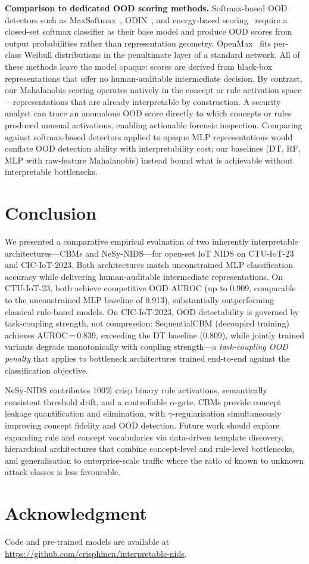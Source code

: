 \documentclass[conference]{IEEEtran}
\begin{document}
\textbf{Comparison to dedicated OOD scoring methods.}
Softmax-based OOD detectors such as
MaxSoftmax~\cite{hendrycks2017baseline}, ODIN~\cite{liang2018odin}, and
energy-based scoring~\cite{liu2020energy} require a closed-set softmax
classifier as their base model and produce OOD scores from output
probabilities rather than representation geometry. OpenMax~\cite{bendale2016openmax}
fits per-class Weibull distributions in the penultimate layer of a
standard network. All of these methods leave the model opaque: scores
are derived from black-box representations that offer no human-auditable
intermediate decision. By contrast, our Mahalanobis scoring operates
natively in the concept or rule activation space---representations that
are already interpretable by construction. A security analyst can trace
an anomalous OOD score directly to which concepts or rules produced
unusual activations, enabling actionable forensic inspection. Comparing
against softmax-based detectors applied to opaque MLP representations
would conflate OOD detection ability with interpretability cost; our
baselines (DT, RF, MLP with raw-feature Mahalanobis) instead bound
what is achievable without interpretable bottlenecks.

\section{Conclusion}

We presented a comparative empirical evaluation of two inherently
interpretable architectures---CBMs and NeSy-NIDS---for open-set IoT
NIDS on CTU-IoT-23 and CIC-IoT-2023. Both architectures match
unconstrained MLP classification accuracy while delivering
human-auditable intermediate representations. On CTU-IoT-23, both
achieve competitive OOD AUROC (up to 0.909, comparable to the
unconstrained MLP baseline of 0.913), substantially
outperforming classical rule-based models. On CIC-IoT-2023, OOD detectability is governed by task-coupling
strength, not compression: SequentialCBM (decoupled training) achieves
AUROC\,=\,0.839, exceeding the DT baseline (0.809), while jointly
trained variants degrade monotonically with coupling strength---a
\emph{task-coupling OOD penalty} that applies to bottleneck
architectures trained end-to-end against the classification objective.

NeSy-NIDS contributes 100\% crisp binary rule activations,
semantically consistent threshold drift, and a controllable
$\alpha$-gate. CBMs provide concept leakage quantification and
elimination, with $\gamma$-regularisation simultaneously improving
concept fidelity and OOD detection. Future work should explore
expanding rule and concept vocabularies via data-driven template
discovery, hierarchical architectures that combine concept-level and
rule-level bottlenecks, and generalisation to enterprise-scale traffic
where the ratio of known to unknown attack classes is less favourable.

\section*{Acknowledgment}
Code and pre-trained models are available at
\url{https://github.com/crisphinen/interpretable-nids}.



\end{document}
